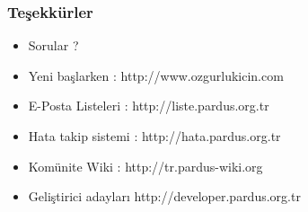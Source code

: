 \documentclass{beamer}
\begin{document}
\frame
{
    \frametitle{Teşekkürler}
    \begin{itemize}
        \item Sorular ?
    \end{itemize}

    \begin{itemize}
        \item Yeni başlarken : http://www.ozgurlukicin.com
        \item E-Posta Listeleri : http://liste.pardus.org.tr
        \item Hata takip sistemi : http://hata.pardus.org.tr
        \item Komünite Wiki : http://tr.pardus-wiki.org
        \item Geliştirici adayları http://developer.pardus.org.tr
    \end{itemize}

}
\end{document}
